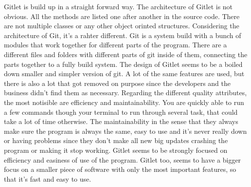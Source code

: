 Gitlet is build up in a straight forward way.
The architecture of Gitlet is not obvious. 
All the methods are listed one after another in the source code.
There are not multiple classes or any other object orinted structures. 
Considering the architecture of Git, it’s a rahter different.
Git is a system build with a bunch of modules that work together for different parts of the program.
There are a different files and folders with different parts of git inside of them, connecting the parts together to a fully build system. 
The design of Gitlet seems to be a boiled down smaller and simpler version of git.
A lot of the same features are used, but there is also a lot that got removed on purpose since the developers and the business didn’t find them as necessary. 
Regarding the different quality attributes, the most notisible are efficiency and maintainability. 
You are quickly able to run a few commands though your terminal to run through several task, that could take a lot of time otherwise. 
The maintainability in the sense that they always make sure the program is always the same, easy to use and it’s never really down or having problems since they don’t make all new big updates crashing the program or making it stop working. 
Gitlet seems to be strongly focused on efficiency and easiness of use of the program.
Gitlet too, seems to have a bigger focus on a smaller piece of software with only the most important features, so that it’s fast and easy to use.
